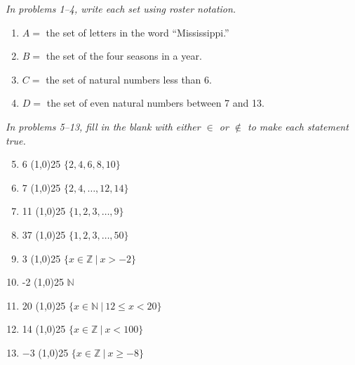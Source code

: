 \emph{In problems 1--4, write each set using roster notation.}
\begin{enumerate}

\item $A=$ the set of letters in the word ``Mississippi.'' 

\item $B=$ the set of the four seasons in a year. 

\item $C=$ the set of natural numbers less than 6. 

\item $D=$ the set of even natural numbers between 7 and 13. 
\end{enumerate}

\emph{In problems 5--13, fill in the blank with either $\in$ or $\notin$ to make each statement true.}
\begin{enumerate}
\setcounter{enumi}{4}

\item 6 \line(1,0){25} $\{2,4,6,8,10\}$ \answer{$\in$}

\item 7 \line(1,0){25} $\{2,4,\ldots,12,14\}$ \answer{$\notin$}

\item 11 \line(1,0){25} $\{1,2,3,\ldots,9\}$ \answer{$\notin$}

\item 37 \line(1,0){25} $\{1,2,3,\ldots,50\}$ \answer{$\in$}

\item 3 \line(1,0){25} $\{x \in \mathbb{Z} \ |\ x > -2\}$ \answer{$\in$}

\item -2 \line(1,0){25} $\mathbb{N}$ \answer{$\notin$}

\item 20 \line(1,0){25} $\{x \in \mathbb{N}\ |\ 12 \leq x < 20\}$ \answer{$\notin$}

\item 14 \line(1,0){25} $\{x \in \mathbb{Z}\ |\ x < 100\}$ \answer{$\in$}

\item $-3$ \line(1,0){25} $\{x \in \mathbb{Z}\ |\ x \geq -8\}$ \answer{$\in$}
\end{enumerate}

